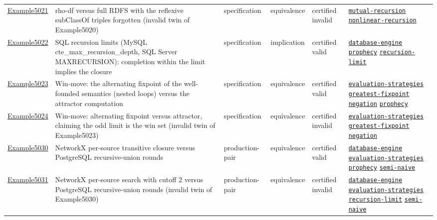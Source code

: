 \documentclass[10pt]{article}
\begin{document}
\begin{longtable}{@{}lp{}p{}p{}p{}p{}@{}}
\hyperref[case:Example5021]{Example5021} & rho-df versus full RDFS with the reflexive subClassOf triples forgotten (invalid twin of Example5020) & specification & equivalence & certified invalid & {\scriptsize \hyperref[tag:mutual-recursion]{\texttt{mutual-recursion}} \hyperref[tag:nonlinear-recursion]{\texttt{nonlinear-recursion}}} \\
\hyperref[case:Example5022]{Example5022} & SQL recursion limits (MySQL cte\_max\_recursion\_depth, SQL Server MAXRECURSION): completion within the limit implies the closure & specification & implication & certified valid & {\scriptsize \hyperref[tag:database-engine]{\texttt{database-engine}} \hyperref[tag:prophecy]{\texttt{prophecy}} \hyperref[tag:recursion-limit]{\texttt{recursion-limit}}} \\
\hyperref[case:Example5023]{Example5023} & Win-move: the alternating fixpoint of the well-founded semantics (nested loops) versus the attractor computation & specification & equivalence & certified valid & {\scriptsize \hyperref[tag:evaluation-strategies]{\texttt{evaluation-strategies}} \hyperref[tag:greatest-fixpoint]{\texttt{greatest-fixpoint}} \hyperref[tag:negation]{\texttt{negation}} \hyperref[tag:prophecy]{\texttt{prophecy}}} \\
\hyperref[case:Example5024]{Example5024} & Win-move: alternating fixpoint versus attractor, claiming the odd limit is the win set (invalid twin of Example5023) & specification & equivalence & certified invalid & {\scriptsize \hyperref[tag:evaluation-strategies]{\texttt{evaluation-strategies}} \hyperref[tag:greatest-fixpoint]{\texttt{greatest-fixpoint}} \hyperref[tag:negation]{\texttt{negation}}} \\
\hyperref[case:Example5030]{Example5030} & NetworkX per-source transitive closure versus PostgreSQL recursive-union rounds & production-pair & equivalence & certified valid & {\scriptsize \hyperref[tag:database-engine]{\texttt{database-engine}} \hyperref[tag:evaluation-strategies]{\texttt{evaluation-strategies}} \hyperref[tag:prophecy]{\texttt{prophecy}} \hyperref[tag:semi-naive]{\texttt{semi-naive}}} \\
\hyperref[case:Example5031]{Example5031} & NetworkX per-source search with cutoff 2 versus PostgreSQL recursive-union rounds (invalid twin of Example5030) & production-pair & equivalence & certified invalid & {\scriptsize \hyperref[tag:database-engine]{\texttt{database-engine}} \hyperref[tag:evaluation-strategies]{\texttt{evaluation-strategies}} \hyperref[tag:recursion-limit]{\texttt{recursion-limit}} \hyperref[tag:semi-naive]{\texttt{semi-naive}}} \\

\end{longtable}
\end{document}
